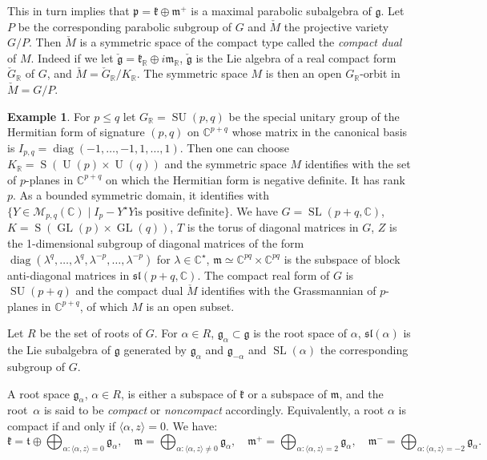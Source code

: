 \documentclass[JEP,XML,SOM,Unicode,NoFloatCountersInSection]{cedram}
\let\mathcal\mathscr
\theoremstyle{plain}
\theoremstyle{definition}
\newtheorem{exem}[theo]{Example}
\let\la\langle
\let\ra\rangle
\DeclareMathOperator{\diag}{diag}
\DeclareMathOperator{\GL}{GL}
\DeclareMathOperator{\rS}{S}
\DeclareMathOperator{\SL}{SL}
\DeclareMathOperator{\SU}{SU}
\DeclareMathOperator{\rU}{U}
\newcommand{\cM}{\mathcal{M}}
\newcommand{\bC}{\mathbb{C}}
\newcommand{\bR}{\mathbb{R}}
\newcommand{\fgg}{\mathfrak{g}}
\newcommand{\fk}{\mathfrak{k}}
\newcommand{\fm}{\mathfrak{m}}
\newcommand{\fp}{\mathfrak{p}}
\newcommand{\ft}{\mathfrak{t}}
\newcommand{\fsl}{\mathfrak{sl}}
\newcommand{\scal}[1]{\langle #1 \rangle}
\begin{document}
This in turn implies that $\fp=\fk\oplus\fm^+$ is a maximal parabolic subalgebra of $\fgg$. Let~$P$ be
the corresponding parabolic subgroup of $G$ and $\check{M}$ the projective variety $G/P$. Then
$\check{M}$ is a symmetric space of the compact type called the \emph{compact dual} of $M$. Indeed if
we let $\check{\fgg}=\fk_\bR\oplus i\fm_\bR$, $\check{\fgg}$ is the Lie algebra of a real compact form
$\check{G}_\bR$ of $G$, and $\check{M}=\check{G}_\bR/K_\bR$. The symmetric space $M$ is then an open
$G_\bR$-orbit in $\check{M}=G/P$.

\begin{exem}
\label{exem:su}
For $p\leq q$ let $G_\bR=\SU(p,q)$ be the special unitary group of the Hermitian form of
signature $(p,q)$ on $\bC^{p+q}$ whose matrix in the canonical basis is
$I_{p,q}=\diag(-1,\ldots,-1,1,\ldots,1)$. Then one can choose
$K_\bR=\rS(\rU(p)\times \rU(q))$ and the symmetric space $M$ identifies with the set of
$p$-planes in $\bC^{p+q}$ on which the Hermitian form is negative definite. It has rank $p$. As a
bounded symmetric domain, it identifies with $\{Y\in\cM_{p,q}(\bC)\mid I_p-Y^\star Y\mbox{
is positive definite} \}$. We have
$G=\SL(p+q,\bC)$, $K=\rS(\GL(p)\times
\GL(q))$, $T$ is the torus of diagonal matrices in $G$, $Z$ is the 1-dimensional subgroup of
diagonal matrices of the form
$\diag(\lambda^q,\ldots,\lambda^q,\lambda^{-p},\ldots,\lambda^{-p})$
for $\lambda\in\bC^\star$,
$\fm\simeq \bC^{pq}\times\bC^{pq}$ is the subspace of block anti-diagonal matrices in
$\fsl(p+q,\bC)$. The compact real form of $G$ is $\SU(p+q)$ and the compact dual
$\check{M}$ identifies with the Grassmannian of $p$-planes in $\bC^{p+q}$, of which $M$ is an open
subset.
\end{exem}

Let $R$ be the set of roots of $G$. For $\alpha\in R$, $\fgg_\alpha\subset\fgg$ is the root space of $\alpha$,
$\fsl(\alpha)$ is the Lie subalgebra of $\fgg$ generated by $\fgg_\alpha$ and $\fgg_{-\alpha}$ and $\SL(\alpha)$ the
corresponding subgroup of $G$.

A root space $\fgg_\alpha$, $\alpha\in R$, is either a subspace of $\fk$ or a subspace of $\fm$, and the root~$\alpha$ is
said to be \emph{compact}
or \emph{noncompact} accordingly. Equivalently, a root $\alpha$ is compact if and only if
$\la\alpha,z\ra=0$. We have:
$$
\fk = \ft \oplus \bigoplus_{\alpha: \la\alpha,z\ra=0} \fgg_\alpha,\quad
\fm = \bigoplus_{\alpha: \la\alpha,z\ra\neq 0} \fgg_\alpha,\quad
\fm^+ = \bigoplus_{\alpha: \scal{\alpha,z}=2} \fgg_\alpha,\quad
\fm^- = \bigoplus_{\alpha: \scal{\alpha,z}=-2} \fgg_\alpha.
$$
\end{document}
